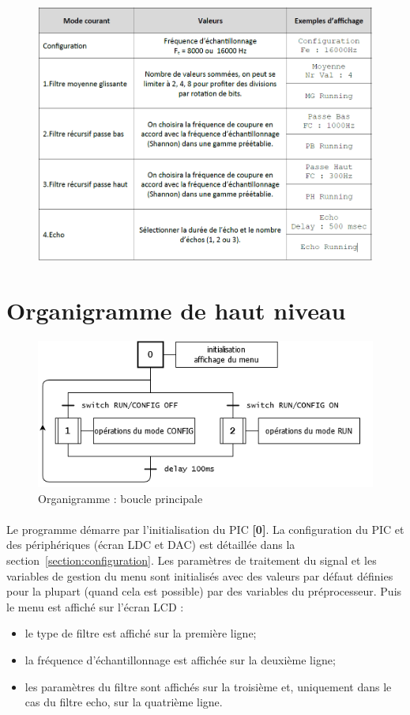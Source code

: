 \documentclass{article}
\begin{document}
    \begin{figure}[H]
        \centering
        \includegraphics[width=.7\textwidth]{./images/menus.png}
    \end{figure}

    \newpage
    \section{Organigramme de haut niveau}
    \begin{figure}[H]
        \centering
        \includegraphics[width=.5\textwidth]{./images/orga_global.png}
        \caption{Organigramme : boucle principale}
    \end{figure}

    \paragraph{}
    Le programme démarre par l'initialisation du PIC \textbf{[0]}. La configuration du PIC et des périphériques (écran LDC et DAC) est détaillée dans la section~\ref{section:configuration}. Les paramètres de traitement du signal et les variables de gestion du menu sont initialisés avec des valeurs par défaut définies pour la plupart (quand cela est possible) par des variables du préprocesseur. Puis le menu est affiché sur l'écran LCD :
    \begin{itemize}
        \item le type de filtre est affiché sur la première ligne;
        \item la fréquence d'échantillonnage est affichée sur la deuxième ligne;
        \item les paramètres du filtre sont affichés sur la troisième et, uniquement dans le cas du filtre echo, sur la quatrième ligne.
    \end{itemize}
\end{document}
